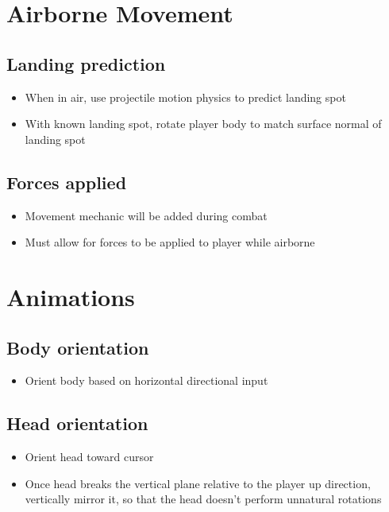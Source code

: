 \documentclass{article}
\begin{document}
\section{Airborne Movement}
    \subsection*{Landing prediction}
    \begin{itemize}
        \item When in air, use projectile motion physics to predict landing spot
        \item With known landing spot, rotate player body to match surface
            normal of landing spot
    \end{itemize}
    \subsection*{Forces applied}
    \begin{itemize}
        \item Movement mechanic will be added during combat
        \item Must allow for forces to be applied to player while airborne
    \end{itemize}

\section{Animations}
    \subsection*{Body orientation}
    \begin{itemize}
        \item Orient body based on horizontal directional input
    \end{itemize}
    \subsection*{Head orientation}
    \begin{itemize}
        \item Orient head toward cursor
        \item Once head breaks the vertical plane relative to the player up
            direction, vertically mirror it, so that the head doesn't perform
            unnatural rotations
    \end{itemize}
\end{document}
